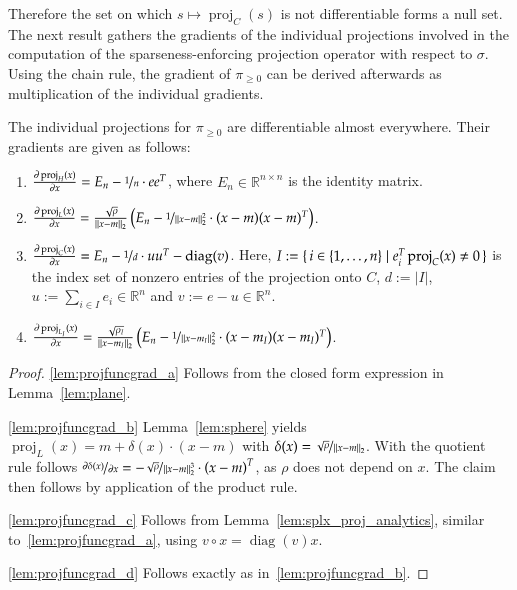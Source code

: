 \documentclass[twoside,11pt]{article}
\DeclareMathOperator{\proj}{proj}
\DeclareMathOperator{\hada}{\circ}
\DeclareMathOperator{\diag}{diag}
\newcommand{\R}{\mathbb{R}}
\newcommand{\0}{\mathcal{O}}
\newcommand{\transp}{^T}
\newcommand{\norm}[1]{\left\Vert#1\right\Vert}
\newcommand{\abs}[1]{\left\vert #1 \right\vert}
\newcommand{\discint}[2]{\{#1,\dotsc,#2\}}
\newcommand{\inint}[2]{\in\discint{#1}{#2}}
\begin{document}
Therefore the set on which $s\mapsto\proj_C(s)$ is not differentiable forms a null set.
The next result gathers the gradients of the individual projections involved in the computation of the sparseness-enforcing projection operator with respect to $\sigma$.
Using the chain rule, the gradient of $\pi_{\geq 0}$ can be derived afterwards as multiplication of the individual gradients.

\begin{lemma}
\label{lem:projfuncgrad}
The individual projections for $\pi_{\geq 0}$ are differentiable almost everywhere. Their gradients are given as follows:
\begin{enumerate}
\item \label{lem:projfuncgrad_a}
$\frac{\partial\proj_H(x)}{\partial x} = E_n - \nicefrac{1}{n}\cdot ee\transp$, where $E_n\in\R^{n\times n}$ is the identity matrix.

\item \label{lem:projfuncgrad_b}
$\frac{\partial\proj_L(x)}{\partial x} = \frac{\sqrt{\rho}}{\norm{x-m}_2}\left(E_n - \nicefrac{1}{\norm{x-m}_2^2}\cdot (x-m)(x-m)\transp\right)$.

\item \label{lem:projfuncgrad_c}
$\frac{\partial\proj_C(x)}{\partial x} = E_n - \nicefrac{1}{d}\cdot uu\transp - \diag(v)$.
Here, $I := \set{i\inint{1}{n} | e_i\transp\proj_C(x) \neq 0}$ is the index set of nonzero entries of the projection onto $C$, $d := \abs{I}$, $u := \sum_{i\in I}e_i\in\R^n$ and $v := e - u\in\R^n$.

\item \label{lem:projfuncgrad_d}
$\frac{\partial\proj_{L_I}(x)}{\partial x} = \frac{\sqrt{\rho_I}}{\norm{x-m_I}_2}\left(E_n - \nicefrac{1}{\norm{x-m_I}_2^2}\cdot (x-m_I)(x-m_I)\transp\right)$.
\end{enumerate}
\end{lemma}
\begin{proof}
\ref{lem:projfuncgrad_a}
Follows from the closed form expression in Lemma~\ref{lem:plane}.

\ref{lem:projfuncgrad_b}
Lemma~\ref{lem:sphere} yields $\proj_L(x) = m + \delta(x)\cdot(x-m)$ with $\delta(x) = \nicefrac{\sqrt{\rho}}{\norm{x - m}_2}$.
With the quotient rule follows $\nicefrac{\partial\delta(x)}{\partial x} = -\nicefrac{\sqrt{\rho}}{\norm{x-m}_2^3}\cdot\left(x - m\right)\transp$, as $\rho$ does not depend on $x$.
The claim then follows by application of the product rule.

\ref{lem:projfuncgrad_c}
Follows from Lemma~\ref{lem:splx_proj_analytics}, similar to~\ref{lem:projfuncgrad_a}, using $v\hada x = \diag(v)x$.

\ref{lem:projfuncgrad_d}
Follows exactly as in~\ref{lem:projfuncgrad_b}.
\end{proof}
\end{document}
